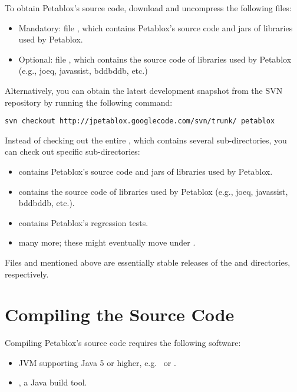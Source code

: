 To obtain Petablox's source code, download and uncompress the following files:

\begin{itemize}
\item
Mandatory: file
\petabloxsrcfile, which contains Petablox's source code and jars of libraries used by
Petablox.
\item
Optional: file \petabloxlibfile, which contains the source code of libraries used
by Petablox (e.g., joeq, javassist, bddbddb, etc.)
\end{itemize}

Alternatively, you can obtain the latest development snapshot from the SVN
repository by running the following command:

\begin{framed}
\begin{verbatim}
svn checkout http://jpetablox.googlecode.com/svn/trunk/ petablox
\end{verbatim}
\end{framed}

Instead of checking out the entire , which contains several
sub-directories, you can check out specific sub-directories:

\begin{itemize}
\item
{} contains Petablox's source code and jars of libraries used by Petablox.
\item
{} contains the source code of libraries used by Petablox (e.g., joeq,
javassist, bddbddb, etc.).
\item
{} contains Petablox's regression tests.
\item
many more; these might eventually move under .
\end{itemize}

Files  and  mentioned
above are essentially stable releases of the  and 
directories, respectively.

\section{Compiling the Source Code}
\label{sec:compiling-sources}

Compiling Petablox's source code requires the following software:

\begin{itemize}
\item
JVM supporting Java 5 or higher, e.g. \ibmjvm\ or \sunjvm.
\item
\ant, a Java build tool.
\end{itemize}

